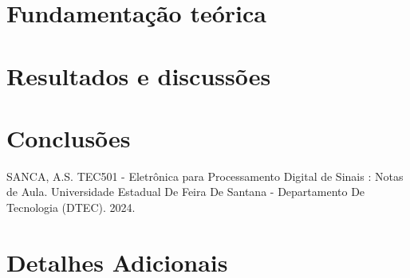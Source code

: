 \documentclass[conference]{IEEEtran}
\begin{document}
\section{Fundamentação teórica}


\section{Resultados e discussões}


\section{Conclusões}



\begin{thebibliography}{00}
     SANCA, A.S. TEC501 - Eletrônica para Processamento Digital de Sinais : Notas de Aula. Universidade Estadual De Feira De Santana - Departamento De Tecnologia (DTEC). 2024.

\end{thebibliography}


\appendix
\section{Detalhes Adicionais}

\end{document}

